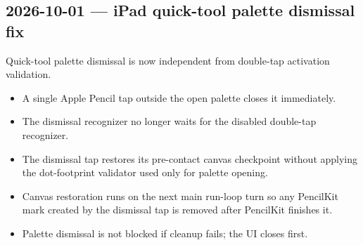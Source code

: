 \documentclass[a4paper]{article}
\title{}
\date{}
\author{Mohammad Rahmani}
\begin{document}
   \maketitle

   \begin{preview}
      \section*{2026-10-01 --- iPad quick-tool palette dismissal fix}

      Quick-tool palette dismissal is now independent from double-tap
      activation validation.

      \begin{itemize}
         \item A single Apple Pencil tap outside the open palette closes it immediately.
         \item The dismissal recognizer no longer waits for the disabled double-tap recognizer.
         \item The dismissal tap restores its pre-contact canvas checkpoint without
               applying the dot-footprint validator used only for palette opening.
         \item Canvas restoration runs on the next main run-loop turn so any PencilKit
               mark created by the dismissal tap is removed after PencilKit finishes it.
         \item Palette dismissal is not blocked if cleanup fails; the UI closes first.
      \end{itemize}
   \end{preview}

   
   
\end{document}

